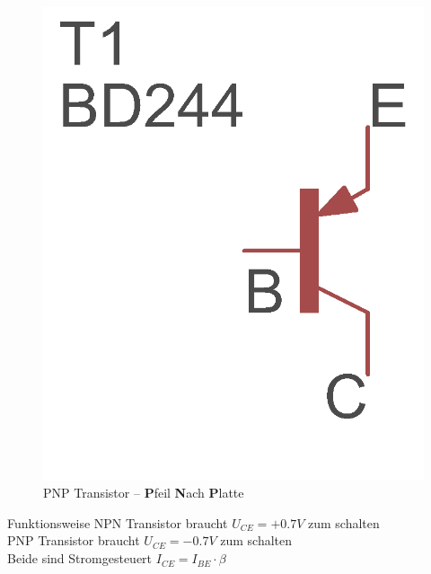 \begin{frame}
\begin{minipage}{0.4\textwidth}
\begin{figure}
      \includegraphics[width=\textwidth,height=.5\textheight,keepaspectratio]{e13/PNP.png}
      \caption{PNP Transistor -- \textbf{P}feil \textbf{N}ach \textbf{P}latte}
    \end{figure}
\end{minipage}

\begin{center}
\begin{block}{Funktionsweise}
NPN Transistor braucht $ U_{CE}=+0.7V$ zum schalten\\
PNP Transistor braucht $ U_{CE}=-0.7V$ zum schalten\\
Beide sind Stromgesteuert $I_{CE} = I_{BE} \cdot \beta$
\end{block}
\end{center}
\end{frame}

